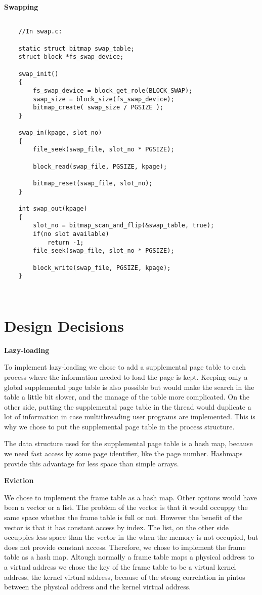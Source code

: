 \textbf{Swapping}

\begin{lstlisting}
	
	//In swap.c:
	
	static struct bitmap swap_table;
	struct block *fs_swap_device;
	
	swap_init()
	{
		fs_swap_device = block_get_role(BLOCK_SWAP);
		swap_size = block_size(fs_swap_device);
		bitmap_create( swap_size / PGSIZE );
	}
	
	swap_in(kpage, slot_no)
	{
		file_seek(swap_file, slot_no * PGSIZE);
		
		block_read(swap_file, PGSIZE, kpage);
		
		bitmap_reset(swap_file, slot_no);
	}
	
	int swap_out(kpage)
	{
		slot_no = bitmap_scan_and_flip(&swap_table, true);
		if(no slot available)
			return -1;
		file_seek(swap_file, slot_no * PGSIZE);
		
		block_write(swap_file, PGSIZE, kpage);
	}
	
\end{lstlisting}

\begin{lstlisting}

\end{lstlisting}

\section{Design Decisions}

\textbf{Lazy-loading}

To implement lazy-loading we chose to add a supplemental page table to each process where the information needed to load the page is kept. Keeping only a global supplemental page table is also possible but would make the search in the table a little bit slower, and the manage of the table more complicated.
On the other side, putting the supplemental page table in the thread would duplicate a lot of information in case multithreading user programs are implemented. This is why we chose to put the supplemental page table in the process structure.

The data structure used for the supplemental page table is a hash map, because we need fast access by some page identifier, like the page number. Hashmaps provide this advantage for less space than simple arrays.

\textbf{Eviction}

We chose to implement the frame table as a hash map. Other options would have been a vector or a list. The problem of the vector is that it would occuppy the same space whether the frame table is full or not. However the benefit of the vector is that it has constant access by index. The list, on the other side occuppies less space than the vector in the when the memory is not occupied, but does not provide constant access. Therefore, we chose to implement the frame table as a hash map.
Altough normally a frame table maps a physical address to a virtual address we chose the key of the frame table to be a virtual kernel address, the kernel virtual address, because of the strong correlation in pintos between the physical address and the kernel virtual address.

